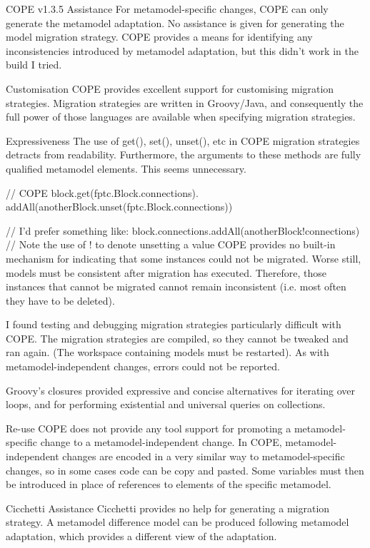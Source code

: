 \documentclass[a4paper]{article}
\begin{document}
COPE v1.3.5
Assistance
For metamodel-specific changes, COPE can only generate the metamodel adaptation. No assistance is given for generating the model migration strategy. COPE provides a means for identifying any inconsistencies introduced by metamodel adaptation, but this didn’t work in the build I tried.

Customisation
COPE provides excellent support for customising migration strategies. Migration strategies are written in Groovy/Java, and consequently the full power of those languages are available when specifying migration strategies.

Expressiveness
The use of get(), set(), unset(), etc in COPE migration strategies detracts from readability. Furthermore, the arguments to these methods are fully qualified metamodel elements. This seems unnecessary.

// COPE
block.get(fptc.Block.connections).
  addAll(anotherBlock.unset(fptc.Block.connections))

// I'd prefer something like:
block.connections.addAll(anotherBlock!connections)
// Note the use of ! to denote unsetting a value
COPE provides no built-in mechanism for indicating that some instances could not be migrated. Worse still, models must be consistent after migration has executed. Therefore, those instances that cannot be migrated cannot remain inconsistent (i.e. most often they have to be deleted).

I found testing and debugging migration strategies particularly difficult with COPE. The migration strategies are compiled, so they cannot be tweaked and ran again. (The workspace containing models must be restarted). As with metamodel-independent changes, errors could not be reported.

Groovy’s closures provided expressive and concise alternatives for iterating over loops, and for performing existential and universal queries on collections.

Re-use
COPE does not provide any tool support for promoting a metamodel-specific change to a metamodel-independent change. In COPE, metamodel-independent changes are encoded in a very similar way to metamodel-specific changes, so in some cases code can be copy and pasted. Some variables must then be introduced in place of references to elements of the specific metamodel.

Cicchetti
Assistance
Cicchetti provides no help for generating a migration strategy. A metamodel difference model can be produced following metamodel adaptation, which provides a different view of the adaptation.
\end{document}
